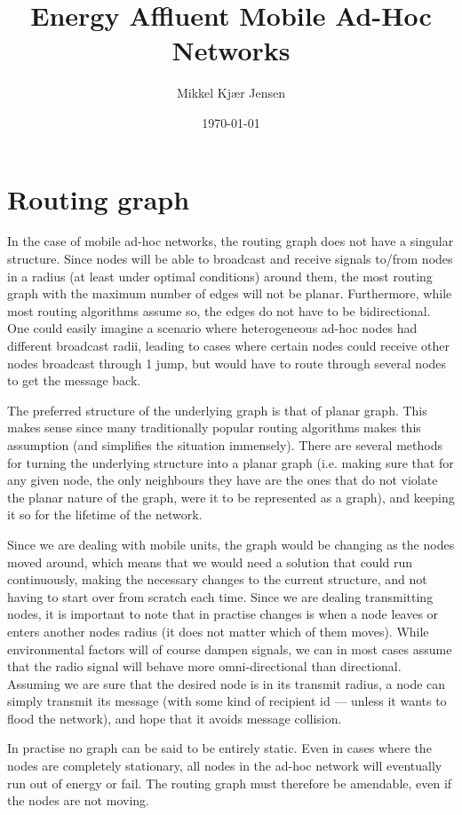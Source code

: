 \documentclass[letter, 12pt, english, draft]{article}
\title{Energy Affluent Mobile Ad-Hoc Networks}
\author{Mikkel Kjær Jensen}
\date{\today}
\begin{document}
\pagestyle{fancy}

\section{Routing graph}

In the case of mobile ad-hoc networks, the routing graph does not have a singular structure. Since nodes will be able to broadcast and receive signals to/from nodes in a radius (at least under optimal conditions) around them, the most routing graph with the maximum number of edges will not be planar. Furthermore, while most routing algorithms assume so, the edges do not have to be bidirectional. One could easily imagine a scenario where heterogeneous ad-hoc nodes had different broadcast radii, leading to cases where certain nodes could receive other nodes broadcast through 1 jump, but would have to route through several nodes to get the message back.

The preferred structure of the underlying graph is that of planar graph. This makes sense since many traditionally popular routing algorithms makes this assumption (and simplifies the situation immensely). There are several methods for turning the underlying structure into a planar graph (i.e. making sure that for any given node, the only neighbours they have are the ones that do not violate the planar nature of the graph, were it to be represented as a graph), and keeping it so for the lifetime of the network.

Since we are dealing with mobile units, the graph would be changing as the nodes moved around, which means that we would need a solution that could run continuously, making the necessary changes to the current structure, and not having to start over from scratch each time. Since we are dealing transmitting nodes, it is important to note that in practise changes is when a node leaves or enters another nodes radius (it does not matter which of them moves). While environmental factors will of course dampen signals, we can in most cases assume that the radio signal will behave more omni-directional than directional. Assuming we are sure that the desired node is in its transmit radius, a node can simply transmit its message (with some kind of recipient id --- unless it wants to flood the network), and hope that it avoids message collision.   

In practise no graph can be said to be entirely static. Even in cases where the nodes are completely stationary, all nodes in the ad-hoc network will eventually run out of energy or fail. The routing graph must therefore be amendable, even if the nodes are not moving. 
\end{document}
